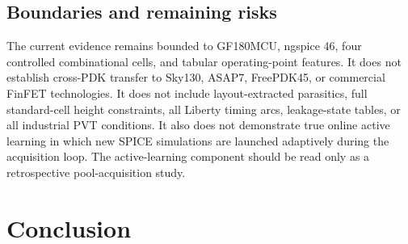 \documentclass[preprint,12pt]{elsarticle}
\begin{document}
\subsection{Boundaries and remaining risks}

The current evidence remains bounded to GF180MCU, ngspice 46, four controlled combinational cells, and tabular operating-point features. It does not establish cross-PDK transfer to Sky130, ASAP7, FreePDK45, or commercial FinFET technologies. It does not include layout-extracted parasitics, full standard-cell height constraints, all Liberty timing arcs, leakage-state tables, or all industrial PVT conditions. It also does not demonstrate true online active learning in which new SPICE simulations are launched adaptively during the acquisition loop. The active-learning component should be read only as a retrospective pool-acquisition study.

\begin{table}[H]
\centering
\caption{Claim boundaries for the revised manuscript.}
\label{tab:boundaries}
\end{table}

\section{Conclusion}
\end{document}
